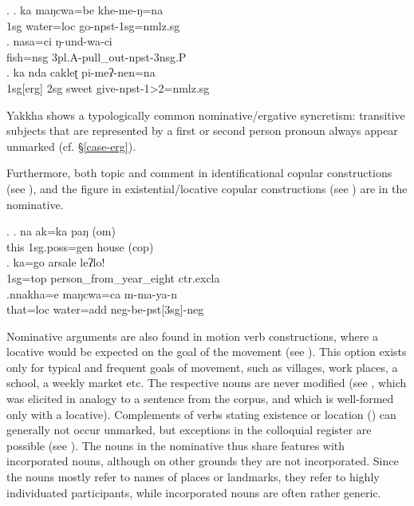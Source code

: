 \ex. \ag. ka maŋcwa=be khe-me-ŋ=na\\
			{\sc 1sg} water{\sc =loc} go{\sc -npst-1sg=nmlz.sg}\\
	\bg. nasa=ci  ŋ-und-wa-ci\\
		fish{\sc =nsg} {\sc 3pl.A-}pull\_out{\sc -npst-3nsg.P}\\
	 \bg. ka nda cakleʈ pi-meʔ-nen=na\\
		{\sc  1sg[erg]} {\sc 2sg} sweet give{\sc -npst-1>2=nmlz.sg}\\
			

Yakkha shows a typologically common nominative/ergative syncretism: transitive subjects that are represented by a first or second person pronoun always appear unmarked (cf. §\ref{case-erg}).
	
Furthermore, both topic and comment in identificational copular constructions (see \Next), and  the figure in existential/locative copular constructions (see \Next[c]) are in the nominative.
	
\ex. \ag. na ak=ka paŋ (om)\\
		this {\sc 1sg.poss=gen} house ({\sc cop})\\
		\bg.   ka=go      arsale          leʔlo!\\
	{\sc 1sg=top} person\_from\_year\_eight {\sc ctr.excla}		\\
	 	
	\bg.nnakha=e    maŋcwa=ca        m-ma-ya-n\\
	that{\sc =loc}  water{\sc =add} {\sc neg-}be{\sc -pst[3sg]-neg}\\
	
Nominative arguments are also found in motion verb constructions, where a locative would be expected on the goal of the movement (see \Next). This option exists only for typical and frequent goals of movement, such as villages, work places, a school, a weekly market etc. The respective nouns are never modified (see \NNext[a], which was elicited in analogy to a sentence from the corpus, and which is well-formed only with a locative). Complements of verbs stating existence or location () can generally not occur unmarked, but exceptions in the colloquial register are possible (see \NNext[b]). The nouns in the nominative thus share features with incorporated nouns, although on other grounds they are not incorporated. Since the nouns mostly refer to names of places or landmarks, they refer to highly individuated participants, while incorporated nouns are often rather generic. 

